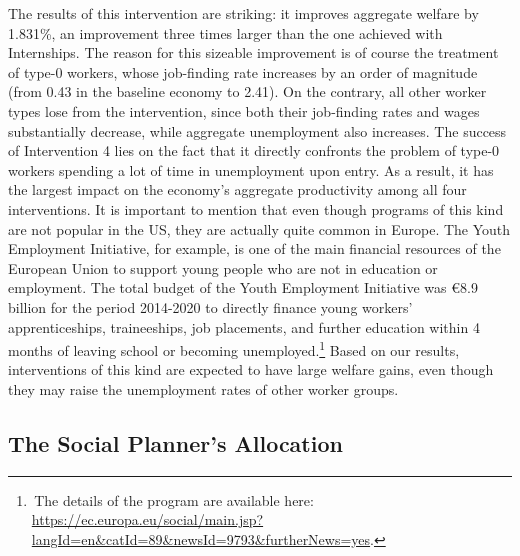 \documentclass[12pt]{article} %
\theoremstyle{definition}
\begin{document}
The results of this intervention are striking: it improves aggregate welfare by 1.831\%, an improvement three times larger than the one achieved with Internships.
The reason for this sizeable improvement is of course the treatment of type-0 workers, whose job-finding rate increases by an order of magnitude (from 0.43 in the baseline economy to 2.41).
On the contrary, all other worker types lose from the intervention, since both their job-finding rates and wages substantially decrease, while aggregate unemployment also increases.
The success of Intervention 4 lies on the fact that it directly confronts the problem of type-0 workers spending a lot of time in unemployment upon entry.
As a result, it has the largest impact on the economy's aggregate productivity among all four interventions.
It is important to mention that even though programs of this kind are not popular in the US, they are actually quite common in Europe.
The Youth Employment Initiative, for example, is one of the main financial resources of the European Union to support young people who are not in education or employment.
The total budget of the Youth Employment Initiative was €8.9 billion for the period 2014-2020 to directly finance young workers' apprenticeships, traineeships, job placements, and further education within 4 months of leaving school or becoming unemployed.\footnote{\,The details of the program are available here: \url{https://ec.europa.eu/social/main.jsp?langId=en&catId=89&newsId=9793&furtherNews=yes}.}
Based on our results, interventions of this kind are expected to have large welfare gains, even though they may raise the unemployment rates of other worker groups.


\subsection{The Social Planner's Allocation} \label{section planner}
\end{document}
